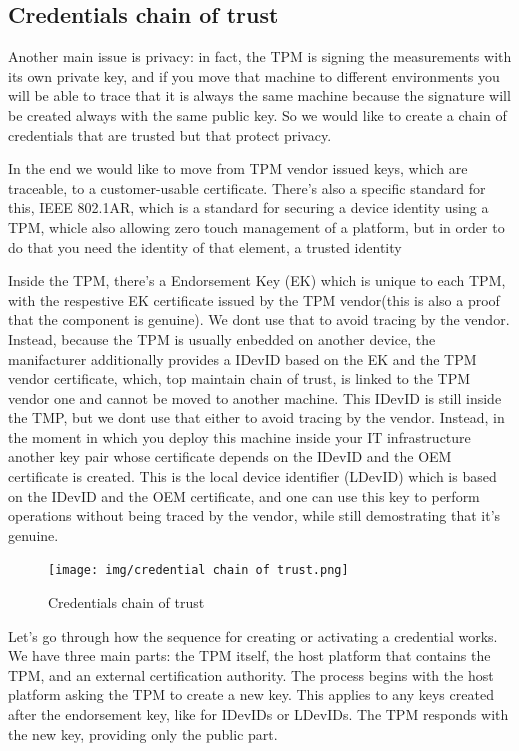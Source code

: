 \subsection{Credentials chain of trust}
Another main issue is privacy: in fact, the TPM is signing the
measurements with its own private key, and if you move that machine to
different environments you will be able to trace that it is always the
same machine because the signature will be created always with the
same public key. So we would like to create a chain of credentials
 that are trusted but that protect privacy.

 In the end we would like to move from TPM vendor issued keys, which
 are traceable, to a customer-usable certificate. There's also a
 specific standard for this, IEEE 802.1AR, which is a standard for 
securing a device identity using a TPM, whicle also allowing zero
touch management of a platform, but in order to do that you need the
identity of that element, a trusted identity

Inside the TPM, there's a Endorsement Key (EK) which is unique to each
TPM, with the respestive EK certificate issued by the TPM vendor(this
is also a proof that the component is genuine). We dont use that to
avoid tracing by the vendor. Instead, because the TPM is usually
enbedded on another device, the manifacturer additionally provides a
IDevID based on the EK and the TPM vendor certificate, which, top
maintain chain of trust, is linked to the TPM vendor one and cannot be
moved to another machine. This IDevID is still inside the TMP, but we
dont use that either to avoid tracing by the vendor. Instead, in the
moment in which you deploy this machine inside your IT infrastructure
another key pair whose certificate depends on the IDevID and the OEM
certificate is created. This is the local device identifier (LDevID)
which is based on the IDevID and the OEM certificate, and one can use
this key to perform operations without being traced by the vendor,
while still demostrating that it's genuine.

\begin{figure}[H]
  \centering
  \texttt{[image: img/credential chain of
  trust.png]}
  \caption{Credentials chain of trust}
\end{figure}

Let's go through how the sequence for creating or activating a
credential works. We have three main parts: the TPM itself, the host
platform that contains the TPM, and an external certification
authority. The process begins with the host platform asking the TPM to
create a new key. This applies to any keys created after the
endorsement key, like for IDevIDs or LDevIDs. The TPM responds with
the new key, providing only the public part.

